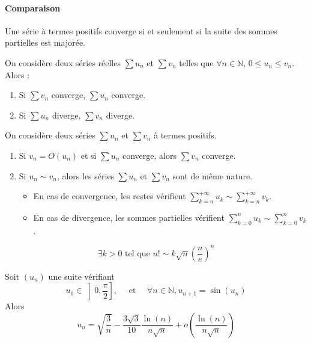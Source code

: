   \paragraph{Comparaison}

  \begin{proposition}
    Une série à termes positifs converge si et seulement si la suite des sommes partielles est majorée.
  \end{proposition}

  \begin{corollary}
    On considère deux séries réelles $\sum u_n$ et $\sum v_n$ telles que $\forall n \in \mathbb{N}, \, 0 \leq u_n \leq v_n$. Alors :
    \begin{enumerate}[label=(\roman*)]
      \item Si $\sum v_n$ converge, $\sum u_n$ converge.
      \item Si $\sum u_n$ diverge, $\sum v_n$ diverge.
    \end{enumerate}
  \end{corollary}

  \begin{proposition}
    On considère deux séries $\sum u_n$ et $\sum v_n$ à termes positifs.
    \begin{enumerate}[label=(\roman*)]
      \item Si $v_n = O(u_n)$ et si $\sum u_n$ converge, alors $\sum v_n$ converge.
      \item Si $u_n \sim v_n$, alors les séries $\sum u_n$ et $\sum v_n$ sont de même nature.
      \begin{itemize}
        \item En cas de convergence, les restes vérifient $\sum_{k=n}^{+\infty} u_k \sim \sum_{k=n}^{+\infty} v_k$.
        \item En cas de divergence, les sommes partielles vérifient $\sum_{k=0}^{n} u_k \sim \sum_{k=0}^{n} v_k$.
      \end{itemize}
    \end{enumerate}
  \end{proposition}


  \begin{application}
    \[ \exists k > 0 \text{ tel que } n! \sim k \sqrt{n} \left( \frac{n}{e} \right)^n \]
  \end{application}


  \begin{application}
    Soit $(u_n)$ une suite vérifiant
    \[ u_0 \in \left] 0, \frac{\pi}{2} \right], \quad \text{ et } \quad \forall n \in \mathbb{N}, u_{n+1} = \sin(u_n) \]
    Alors
    \[ u_n = \sqrt{\frac{3}{n}} - \frac{3\sqrt{3}}{10} \frac{\ln(n)}{n\sqrt{n}} + o \left( \frac{\ln(n)}{n\sqrt{n}} \right) \]
  \end{application}

